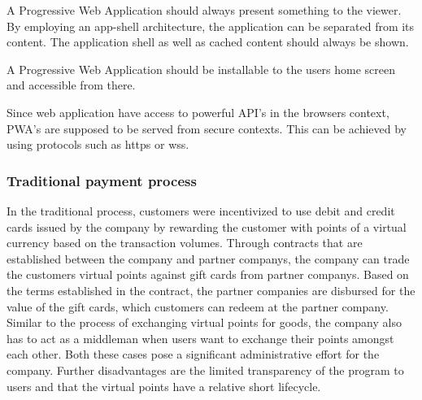 \documentclass[a4paper]{article}
\begin{document}
\begin{theorem}
A Progressive Web Application should always present something to the viewer. By employing an app-shell architecture, the application can be separated from its content. The application shell as well as cached content should always be shown.
\end{theorem}
\begin{theorem-install}
A Progressive Web Application should be installable to the users home screen and accessible from there.

\end{theorem-install}
\begin{theorem-secure}
Since web application have access to powerful API's in the browsers context, PWA's are supposed to be served from secure contexts. This can be achieved by using protocols such as https or wss.

\end{theorem-secure}
\subsubsection{Traditional payment process}
In the traditional process, customers were incentivized to use debit and credit cards issued by the company by rewarding the customer with points of a virtual currency based on the transaction volumes.
Through contracts that are established between the company and partner companys, the company can trade the customers virtual points against gift cards from partner companys.
Based on the terms established in the contract, the partner companies are disbursed for the value of the gift cards, which customers can redeem at the partner company.
Similar to the process of exchanging virtual points for goods, the company also has to act as a middleman when users want to exchange their points amongst each other. Both these cases pose a significant administrative effort for the company. Further disadvantages are the limited transparency of the program to users and that the virtual points have a relative short lifecycle.
\end{document}
